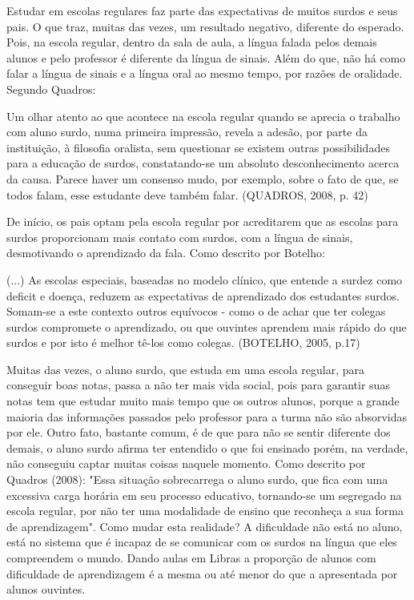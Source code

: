 \documentclass[brasil]{abnt}
\begin{document}
			
	Estudar em escolas regulares faz parte das expectativas de muitos surdos e seus pais. O que traz, muitas das vezes, um resultado negativo, diferente do esperado.
	Pois, na escola regular, dentro da sala de aula, a língua falada pelos demais alunos e pelo professor é diferente da língua de sinais. Além do que, não há como falar
	a língua de sinais e a língua oral ao mesmo tempo, por razões de oralidade. Segundo Quadros:
	
		\begin{citacao} Um olhar atento ao que acontece na escola regular quando se aprecia o trabalho com aluno surdo, numa primeira impressão, revela a adesão, por parte
						da instituição, à filosofia oralista, sem questionar se existem outras possibilidades para a educação de surdos, constatando-se um absoluto 
						desconhecimento acerca da causa. Parece haver um consenso mudo, por exemplo, sobre o fato de que, se todos falam, esse estudante deve também falar.
						(QUADROS, 2008, p. 42)
		\end{citacao}
	
	De início, os pais optam pela escola regular por acreditarem que as escolas para surdos proporcionam mais contato com surdos, com a língua de sinais, desmotivando o
	aprendizado da fala. Como descrito por Botelho:
	
		\begin{citacao}(...) As escolas especiais, baseadas no modelo clínico, que entende a surdez como deficit e doença, reduzem as expectativas de aprendizado dos 
						estudantes surdos. Somam-se a este contexto outros equívocos - como o de achar que ter colegas surdos compromete o aprendizado, ou que ouvintes 
						aprendem mais rápido do que surdos e por isto é melhor tê-los como colegas. (BOTELHO, 2005, p.17)
		\end{citacao}
	
	Muitas das vezes, o aluno surdo, que estuda em uma escola regular, para conseguir boas notas, passa a não ter mais vida social, pois para garantir suas notas tem que estudar
	muito mais tempo que os outros alunos, porque a grande maioria das informações passados pelo professor para a turma não são absorvidas por ele. Outro fato, bastante comum, é
	de que para não se sentir diferente dos demais, o aluno surdo afirma ter entendido o que foi ensinado porém, na verdade, não conseguiu captar muitas coisas naquele momento.
	Como descrito por Quadros (2008): "Essa situação sobrecarrega o aluno surdo, que fica com uma excessiva carga horária em seu processo educativo, tornando-se um segregado na 
	escola regular, por não ter uma modalidade de ensino que reconheça a sua forma de aprendizagem". Como mudar esta realidade? A dificuldade não está no aluno, está no sistema que é incapaz 
	de se comunicar com os surdos na língua que eles compreendem o mundo. Dando aulas em Libras a proporção de alunos com dificuldade de aprendizagem é a mesma ou até menor do que a apresentada 
	por alunos ouvintes.
	
\end{document}
